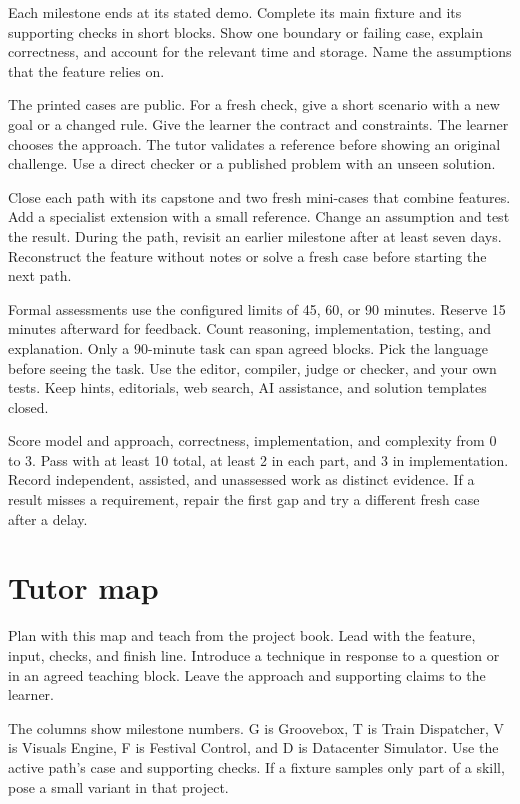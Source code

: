 \documentclass[11pt,letterpaper]{article}
\begin{document}
Each milestone ends at its stated demo. Complete its main fixture and its supporting checks in short blocks. Show one boundary or failing case, explain correctness, and account for the relevant time and storage. Name the assumptions that the feature relies on.

The printed cases are public. For a fresh check, give a short scenario with a new goal or a changed rule. Give the learner the contract and constraints. The learner chooses the approach. The tutor validates a reference before showing an original challenge. Use a direct checker or a published problem with an unseen solution.

Close each path with its capstone and two fresh mini-cases that combine features. Add a specialist extension with a small reference. Change an assumption and test the result. During the path, revisit an earlier milestone after at least seven days. Reconstruct the feature without notes or solve a fresh case before starting the next path.

Formal assessments use the configured limits of 45, 60, or 90 minutes. Reserve 15 minutes afterward for feedback. Count reasoning, implementation, testing, and explanation. Only a 90-minute task can span agreed blocks. Pick the language before seeing the task. Use the editor, compiler, judge or checker, and your own tests. Keep hints, editorials, web search, AI assistance, and solution templates closed.

Score model and approach, correctness, implementation, and complexity from 0 to 3. Pass with at least 10 total, at least 2 in each part, and 3 in implementation. Record independent, assisted, and unassessed work as distinct evidence. If a result misses a requirement, repair the first gap and try a different fresh case after a delay.

\clearpage

\section{Tutor map}

Plan with this map and teach from the project book. Lead with the feature, input, checks, and finish line. Introduce a technique in response to a question or in an agreed teaching block. Leave the approach and supporting claims to the learner.

The columns show milestone numbers. G is Groovebox, T is Train Dispatcher, V is Visuals Engine, F is Festival Control, and D is Datacenter Simulator. Use the active path's case and supporting checks. If a fixture samples only part of a skill, pose a small variant in that project.
\end{document}
